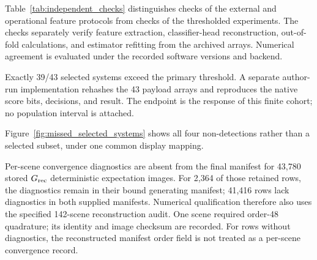 Table~\ref{tab:independent_checks} distinguishes checks of the external and
operational feature protocols from checks of the thresholded experiments.
The checks separately verify feature extraction, classifier-head
reconstruction, out-of-fold calculations, and estimator refitting from the
archived arrays. Numerical agreement is evaluated under the recorded software
versions and backend.

Exactly 39/43 selected systems exceed the primary threshold. A separate
author-run implementation rehashes the 43 payload arrays and reproduces the
native score bits, decisions, and result. The endpoint is the response of
this finite cohort; no population interval is attached.

Figure~\ref{fig:missed_selected_systems} shows all four non-detections rather
than a selected subset, under one common display mapping.

Per-scene convergence diagnostics are absent from the final manifest for
43,780 stored \(G_{\rm rec}\) deterministic expectation images. For 2,364 of
those retained rows, the diagnostics remain in their bound generating
manifest; 41,416 rows lack diagnostics in both supplied manifests. Numerical
qualification therefore also uses the specified 142-scene reconstruction
audit. One scene required order-48 quadrature; its identity and image checksum
are recorded. For rows without diagnostics, the reconstructed manifest order
field is not treated as a per-scene convergence record.

